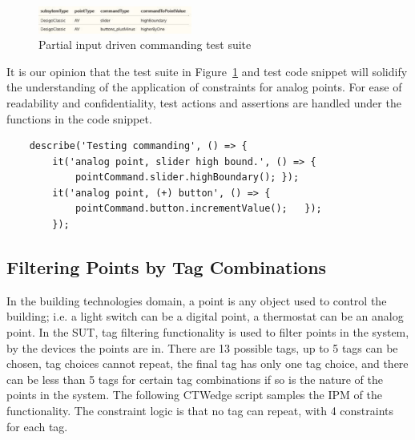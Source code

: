 \documentclass[conference]{IEEEtran}
\begin{document}
	\begin{figure}[!t]
		\includegraphics[width=0.45\textwidth,]{csvOutputCommanding.pdf}
		\caption{Partial input driven commanding test suite}
		\label{fig:csvOutputCommanding}
	\end{figure}

	It is our opinion that the test suite in Figure~\ref{fig:csvOutputCommanding} and test code snippet will solidify the understanding of the application of constraints for analog points.
	For ease of readability and confidentiality, test actions and assertions are handled under the functions in the code snippet. 

	\begin{lstlisting}
	describe('Testing commanding', () => {
		it('analog point, slider high bound.', () => {
			pointCommand.slider.highBoundary(); });
		it('analog point, (+) button', () => {
			pointCommand.button.incrementValue();	}); 
		});
	\end{lstlisting}

	\subsection{Filtering Points by Tag Combinations }

	In the building technologies domain, a point is any object used to control the building; i.e. a light switch can be a digital point, a thermostat can be an analog point.
	In the SUT, tag filtering functionality is used to filter points in the system, by the devices the points are in.
	There are 13 possible tags, up to 5 tags can be chosen, tag choices cannot repeat, the final tag has only one tag choice, and there can be less than 5 tags for certain tag combinations if so is the nature of the points in the system.
	The following CTWedge script samples the IPM of the functionality.
	The constraint logic is that no tag can repeat, with 4 constraints for each tag.
\end{document}
